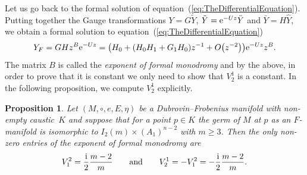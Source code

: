 \documentclass[10pt,a4paper]{amsart}
\numberwithin{equation}{section}
\newtheorem{Proposition}[Theorem]{Proposition}
 { \theoremstyle{definition}
\newtheorem{Definition}[Theorem]{Definition}
\newtheorem{Note}[Theorem]{Note}
\newtheorem{Example}[Theorem]{Example}
\newtheorem{Remark}[Theorem]{Remark} }
\begin{document}
 Let us go back to the formal solution of equation~(\ref{eq:TheDifferentialEquation}). Putting together the Gauge transformations $Y=G\tilde{Y}$, $\tilde{Y}={\rm e}^{-Uz}\bar{Y}$ and $\bar{Y}=H\hat{Y}$, we obtain a formal solution to equation~(\ref{eq:TheDifferentialEquation})%
 \begin{equation}
 \label{eq:FormalSolution}
 Y_{F}=GHz^{B}{\rm e}^{-Uz}=\bigl(H_{0}+(H_{0}H_{1}+G_{1}H_{0})z^{-1}+O\bigl(z^{-2}\bigr)\bigr){\rm e}^{-Uz}z^{B}.
 \end{equation}
 The matrix $B$ is called the \emph{exponent of formal monodromy} and by the above, in order to prove that it is constant we only need to show that $V^{1}_{2}$ is a constant. In the following proposition, we compute $V^{1}_{2}$ explicitly.
 \begin{Proposition}
 \label{prop:ExponentMultiplication}
 Let $(M,\circ,e,E,\eta)$ be a Dubrovin--Frobenius manifold with non-empty caustic~$K$ and suppose that for a point $p\in K$ the germ of $M$ at $p$ as an $F$-manifold is isomorphic to $I_{2}(m)\times(A_{1})^{n-2}$ with $m\geq 3$. Then the only non-zero entries of the exponent of formal monodromy are
 \begin{equation*}
 V^{2}_{1}=\frac{{\rm i}}{2}\frac{m-2}{m} \qquad \text{and} \qquad V^{1}_{2}=-V^{2}_{1}=-\frac{{\rm i}}{2}\frac{m-2}{m}.
 \end{equation*}
\end{Proposition}
\end{document}
